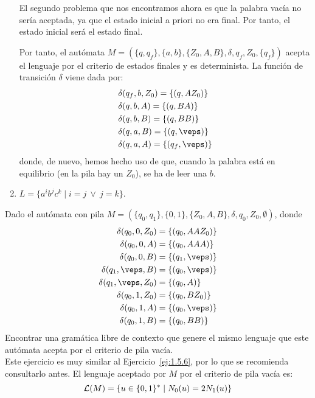 \begin{ejercicio}
\begin{enumerate}
        El segundo problema que nos encontramos ahora es que la palabra vacía no sería aceptada, ya que el estado inicial a priori no era final. Por tanto, el estado inicial será el estado final.

        Por tanto, el autómata $M = (\{q, q_f\},\{a,b\},\{Z_0,A,B\},\delta,q_{f},Z_0,\{q_f\})$ acepta el lenguaje por el criterio de estados finales y es determinista. La función de transición $\delta$ viene dada por:
        \begin{align*}
            &\delta(q_{f},b,Z_0) = \{(q,AZ_0)\} \\
            &\delta(q,b,A) = \{(q,BA)\} \\
            &\delta(q,b,B) = \{(q,BB)\} \\
            &\delta(q,a,B) = \{(q,\veps)\} \\
            &\delta(q,a,A) = \{(q_f,\veps)\}
        \end{align*}
        donde, de nuevo, hemos hecho uso de que, cuando la palabra está en equilibrio (en la pila hay un $Z_0$), se ha de leer una $b$.
        \item $L = \{a^i b^j c^k \mid i=j\ \lor\ j = k\}$.
        
    \end{enumerate}
\end{ejercicio}

\begin{ejercicio}\label{ej:1.5.13}
    Dado el autómata con pila $M = (\{q_0,q_1\},\{0,1\},\{Z_0,A,B\},\delta,q_0,Z_0,\emptyset )$, donde
    \begin{align*}
        \delta(q_0,0,Z_0) &= \{(q_0,AAZ_0)\}\\
        \delta(q_0,0,A) &= \{(q_0,AAA)\}\\
        \delta(q_0,0,B) &= \{(q_1,\veps)\}\\
        \delta(q_1,\veps,B) &= \{(q_0,\veps)\}\\
        \delta(q_1,\veps,Z_0) &= \{(q_0,A)\}\\
        \delta(q_0,1,Z_0) &= \{(q_0,BZ_0)\}\\
        \delta(q_0,1,A) &= \{(q_0,\veps)\}\\
        \delta(q_0,1,B) &= \{(q_0,BB)\}
    \end{align*}
    Encontrar una gramática libre de contexto que genere el mismo lenguaje que este autómata acepta por el criterio de pila vacía.\\

    Este ejercicio es muy similar al Ejercicio~\ref{ej:1.5.6}, por lo que se recomienda consultarlo antes. El lenguaje aceptado por $M$ por el criterio de pila vacía es:
    \begin{equation*}
        \mathcal{L}(M)=\{u\in \{0,1\}^\ast \mid N_0(u) = 2N_1(u)\}
    \end{equation*}

\end{ejercicio}

